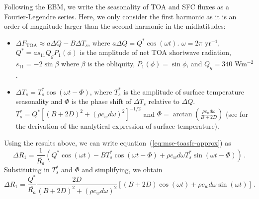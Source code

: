 \documentclass{ametsocV5}
\begin{document}
\appendix[C]
Following the \cite{rose2017} EBM, we write the seasonality of TOA and SFC fluxes as a Fourier-Legendre series. Here, we only consider the first harmonic as it is an order of magnitude larger than the second harmonic in the midlatitudes:
    \begin{itemize}
      \item $\Delta F_{\mathrm{TOA}} \approx a\Delta Q - B\Delta T_{s}$, where $a\Delta Q = Q^{*}\cos(\omega t)$. $\omega=2\pi$ yr$^{-1}$, $Q^{*}=as_{11}Q_{g}P_{1}(\phi)$ is the amplitude of net TOA shortwave radiation, $s_{11}=-2\sin{\beta}$ where $\beta$ is the obliquity, $P_1(\phi) = \sin\phi$, and $Q_{g}=340$ Wm$^{-2}$. 
      \item $\Delta T_{s} = T_{s}^{*}\cos(\omega t - \Phi)$, where $T_{s}^{*}$ is the amplitude of surface temperature seasonality and $\Phi$ is the phase shift of $\Delta T_{s}$ relative to $\Delta Q$. $T_{s}^{*}=Q^{*}\left[(B+2D)^{2}+(\rho c_w d \omega)^{2}\right]^{-1/2}$ and $\Phi=\arctan\left(\frac{\rho c_w d \omega}{B+2D}\right)$ (see \cite{rose2017} for the derivation of the analytical expression of surface temperature).
    \end{itemize}
  Using the results above, we can write equation~(\ref{eq:mse-toasfc-approx}) as
  \begin{equation} \label{eq:r1-linear3}
    \Delta R_{1} = \frac{1}{\overline{R_{a}}}\left(Q^{*}\cos(\omega t) -BT_s^{*}\cos(\omega t - \Phi)+\rho c_{w} d \omega T_{s}^{*}\sin(\omega t - \Phi) \right) \, .
  \end{equation}
  Substituting in $T_{s}^{*}$ and $\Phi$ and simplifying, we obtain
  \begin{equation} \label{eq:r1-linear4-deriv}
    \Delta R_{1} = \frac{Q^{*}}{\overline{R_{a}}}\frac{2D}{(B+2D)^{2}+(\rho c_w d \omega)^{2}}\left[(B+2D)\cos(\omega t)+\rho c_w d \omega \sin(\omega t)\right] \, .
  \end{equation}



\end{document}
